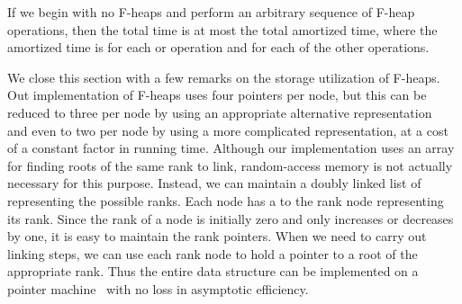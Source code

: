 \begin{theorem}
    If we begin with no F-heaps and perform an arbitrary sequence of F-heap
    operations, then the total time is at most the total amortized time, where the
    amortized time is  for each  or 
    operation and  for each of the other operations.
\end{theorem}

We close this section with a few remarks on the storage utilization of F-heaps. Out
implementation of F-heaps uses four pointers per node, but this can be reduced to
three per node by using an appropriate alternative representation~\cite{Brown1978}
and even to two per node by using a more complicated representation, at a cost of
a constant factor in running time. Although our implementation uses an array for
finding roots of the same rank to link, random-access memory is not actually
necessary for this purpose.  Instead, we can maintain a doubly linked list of
 representing the possible ranks. Each node has a  to the rank node representing its rank. Since the rank of a node is
initially zero and only increases or decreases by one, it is easy to maintain the
rank pointers. When we need to carry out linking steps, we can use each rank node to
hold a pointer to a root of the appropriate rank.  Thus the entire data structure can
be implemented on a pointer machine~\cite{Tarjan1979a} with no loss in asymptotic
efficiency.

